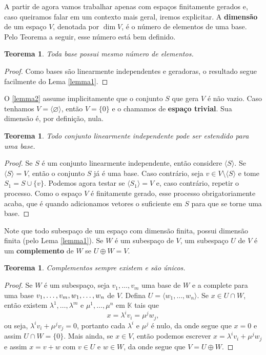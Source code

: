 \documentclass{article}
\newtheorem{theorem}[definition]{Teorema}
\begin{document}
A partir de agora vamos trabalhar apenas com espaços finitamente gerados e, caso queiramos falar em um contexto mais geral, iremos explicitar. A \textbf{dimensão} de um espaço $V$, denotada por $\dim V$, é o número de elementos de uma base. Pelo Teorema a seguir, esse número está bem definido.

\begin{theorem}
    Toda base possui mesmo número de elementos.
\end{theorem}
\begin{proof}
    Como bases são linearmente independentes e geradoras, o resultado segue facilmente do Lema \ref{lemma1}.
\end{proof}

O \ref{lemma2} assume implicitamente que o conjunto $S$ que gera $V$ é não vazio. Caso tenhamos $V = \langle\varnothing\rangle$, então $V = \{0\}$ e o chamamos de \textbf{espaço trivial}. Sua dimensão é, por definição, nula.

\begin{theorem}
    Todo conjunto linearmente independente pode ser estendido para uma base.
\end{theorem}
\begin{proof}
    Se $S$ é um conjunto linearmente independente, então considere $\langle S \rangle$. Se $\langle S \rangle = V$, então o conjunto $S$ já é uma base. Caso contrário, seja $v \in V \setminus \langle S \rangle$ e tome $S_1 = S \cup \{v\}$. Podemos agora testar se $\langle S_1 \rangle = V$ e, caso contrário, repetir o processo. Como o espaço $V$ é finitamente gerado, esse processo obrigatoriamente acaba, que é quando adicionamos vetores o suficiente em $S$ para que se torne uma base.
\end{proof}

Note que todo subespaço de um espaço com dimensão finita, possui dimensão finita (pelo Lema \ref{lemma1}). Se $W$ é um subespaço de $V$, um subespaço $U$ de $V$ é um \textbf{complemento} de $W$ se $U \oplus W = V$.

\begin{theorem}
    Complementos sempre existem e são únicos.
\end{theorem}
\begin{proof}
    Se $W$ é um subespaço, seja $v_1, \dots, v_m$ uma base de $W$ e a complete para uma base $v_1, \dots, v_m, \\w_1, \dots, w_n$ de $V$. Defina $U = \langle w_1, \dots, w_n \rangle$. Se $x \in U \cap W$, então existem $\lambda^1, \dots, \lambda^m$ e $\mu^1, \dots, \mu^n$ em $\mathbb{K}$ tais que \begin{equation}
        x = \lambda^i v_i = \mu^j w_j,
    \end{equation}
    ou seja, $\lambda^i v_i + \mu^j v_j = 0$, portanto cada $\lambda^i$ e $\mu^j$ é nulo, da onde segue que $x = 0$ e assim $U \cap W = \{0\}$. Mais ainda, se $x \in V$, então podemos escrever $x = \lambda^i v_i + \mu^j w_j$ e assim $x = v + w$ com $v \in U$ e $w \in W$, da onde segue que $V = U \oplus W$.
\end{proof}
\end{document}
